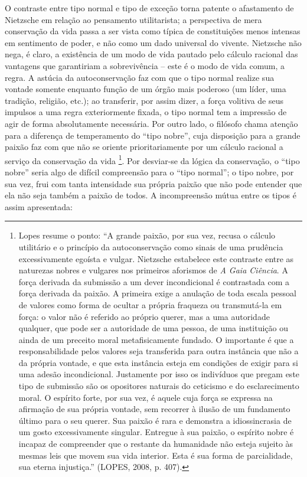 \documentclass[
	12pt,				%
	openright,			%
	oneside,			%
	a4paper,			%
	english,			%
	french,				%
	spanish,			%
	brazil				%
	]{abntex2}
\begin{document}
	O contraste entre tipo normal e tipo de exceção torna patente o afastamento de Nietzsche em relação ao pensamento utilitarista; a perspectiva de mera conservação da vida passa a ser vista como típica de constituições menos intensas em sentimento de poder, e não como um dado universal do vivente. Nietzsche não nega, é claro, a existência de um modo de vida pautado pelo cálculo racional das vantagens que garantiriam a sobrevivência – este é o modo de vida comum, a regra. A astúcia da autoconservação faz com que o tipo normal realize sua vontade somente enquanto função de um órgão mais poderoso (um líder, uma tradição, religião, etc.); ao transferir, por assim dizer, a força volitiva de seus impulsos a uma regra exteriormente fixada, o tipo normal tem a impressão de agir de forma absolutamente necessária. Por outro lado, o filósofo chama atenção para a diferença de temperamento do “tipo nobre”, cuja disposição para a grande paixão faz com que não se oriente prioritariamente por um cálculo racional a serviço da conservação da vida
\footnote{Lopes resume o ponto: “A grande paixão, por sua vez, recusa o cálculo utilitário e o princípio da autoconservação como sinais de uma prudência excessivamente egoísta e vulgar. Nietzsche estabelece este contraste entre as naturezas nobres e vulgares nos primeiros aforismos de \textit{A Gaia Ciência}. A força derivada da submissão a um dever incondicional é contrastada com a força derivada da paixão. A primeira exige a anulação de toda escala pessoal de valores como forma de ocultar a própria fraqueza ou transmutá-la em força: o valor não é referido ao próprio querer, mas a uma autoridade qualquer, que pode ser a autoridade de uma pessoa, de uma instituição ou ainda de um preceito moral metafisicamente fundado. O importante é que a responsabilidade pelos valores seja transferida para outra instância que não a da própria vontade, e que esta instância esteja em condições de exigir para si uma adesão incondicional. Justamente por isso os indivíduos que pregam este tipo de submissão são os opositores naturais do ceticismo e do esclarecimento moral. O espírito forte, por sua vez, é aquele cuja força se expressa na afirmação de sua própria vontade, sem recorrer à ilusão de um fundamento último para o seu querer. Sua paixão é rara e demonstra a idiossincrasia de um gosto excessivamente singular. Entregue à sua paixão, o espírito nobre é incapaz de compreender que o restante da humanidade não esteja sujeito às mesmas leis que movem sua vida interior. Esta é sua forma de parcialidade, sua eterna injustiça.” (LOPES, 2008, p. 407).}.
Por desviar-se da lógica da conservação, o “tipo nobre” seria algo de difícil compreensão para o “tipo normal”; o tipo nobre, por sua vez, frui com tanta intensidade sua própria paixão que não pode entender que ela não seja também a paixão de todos. A incompreensão mútua entre os tipos é assim apresentada:
\end{document}
